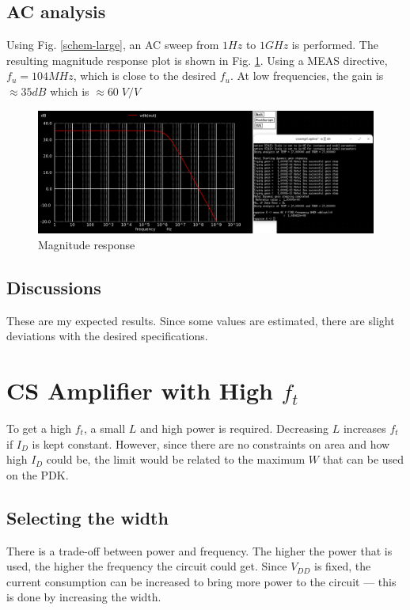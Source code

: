 \documentclass[conference]{IEEEtran}
\begin{document}
\subsection{AC analysis}
Using Fig. \ref{schem-large}, an AC sweep from $1 Hz$ to $1GHz$ is performed. The resulting magnitude response plot is shown in Fig. \ref{vdb}. Using a MEAS directive, $f_u=104MHz$, which is close to the desired $f_u$. At low frequencies, the gain is $\approx 35dB$
which is $\approx 60\; V/V$
\begin{figure}[H]
	\centering 
	\includegraphics[width=\columnwidth]{vdb.png}
	\caption{Magnitude response}
	\label{vdb}
\end{figure}
\subsection{Discussions}
These are my expected results. Since some values are estimated, there are slight deviations with the desired specifications. 

\vspace{8pt}
\section{CS Amplifier with High $f_t$} 
To get a high $f_t$, a small $L$ and high power is required. Decreasing $L$ increases $f_t$ if $I_D$ is kept constant. However, since there are no constraints on area and how high $I_D$ could be, the limit would be related to the maximum $W$ that can be used on the PDK. 

\subsection{Selecting the width}
There is a trade-off between power and frequency. The higher the power that is used, the higher the frequency the circuit could get. Since $V_{DD}$ is fixed, the current consumption can be increased to bring more power to the circuit --- this is done by increasing the width. 
\end{document}
